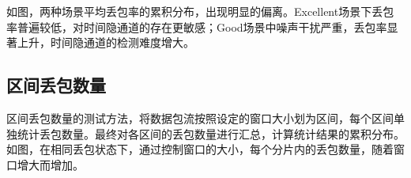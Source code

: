 
如图，两种场景平均丢包率的累积分布，出现明显的偏离。Excellent场景下丢包率普遍较低，对时间隐通道的存在更敏感；Good场景中噪声干扰严重，丢包率显著上升，时间隐通道的检测难度增大。

\subsection{区间丢包数量}
\label{chap:analyze:results:window}

区间丢包数量的测试方法，将数据包流按照设定的窗口大小划为区间，每个区间单独统计丢包数量。最终对各区间的丢包数量进行汇总，计算统计结果的累积分布。如图，在相同丢包状态下，通过控制窗口的大小，每个分片内的丢包数量，随着窗口增大而增加。


